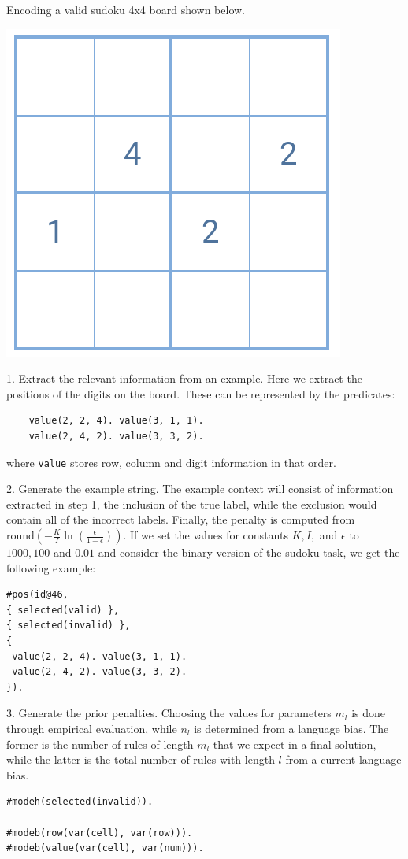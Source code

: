 \begin{example}
\label{sudoku4x4-examples-prior}
Encoding a valid sudoku 4x4 board shown below.

\begin{center}
\setlength\parskip{0pt}
\includegraphics[width=.2\linewidth]{logic-based-classification/example_sudoku_board.png}
\end{center}

1. Extract the relevant information from an example. Here we extract the positions of the digits on the board.
These can be represented by the predicates:
\begin{verbatim}
    value(2, 2, 4). value(3, 1, 1). 
    value(2, 4, 2). value(3, 3, 2).
\end{verbatim}
where \verb_value_ stores row, column and digit information in that order.

2. Generate the example string. 
The example context will consist of information extracted in step 1, the inclusion of the true label, while the exclusion would contain all of the incorrect labels.
Finally, the penalty is computed from $\text{round} \left ( -\frac{K}{I} \ln \left ( \frac{\epsilon}{1 - \epsilon} \right ) \right )$.
If we set the values for constants $K, I,$ and $\epsilon$ to $1000, 100$ and $0.01$ and consider the binary version of the sudoku task, we get the following example:

\begin{verbatim}
#pos(id@46,
{ selected(valid) },
{ selected(invalid) },
{
 value(2, 2, 4). value(3, 1, 1). 
 value(2, 4, 2). value(3, 3, 2).
}).
\end{verbatim}

3. Generate the prior penalties.
Choosing the values for parameters $m_l$ is done through empirical evaluation, while $n_l$ is determined from a language bias.
The former is the number of rules of length $m_l$ that we expect in a final solution, while the latter is the total number of rules with length $l$ from a current language bias.

\begin{verbatim}
#modeh(selected(invalid)).

#modeb(row(var(cell), var(row))).
#modeb(value(var(cell), var(num))).


\end{verbatim}
\end{example}
